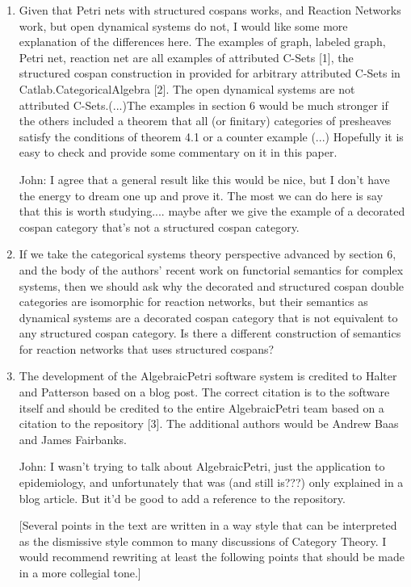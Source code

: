 \documentclass[reqno]{amsart}
\def\john{\color{red} John: }
\begin{document}
\begin{enumerate}
\item Given that Petri nets with structured cospans works, and Reaction Networks work, but open dynamical systems do not, I would like some more 
explanation of the differences here. The examples of graph, labeled 
graph, Petri net, reaction net are all examples of attributed C-Sets [1], the structured cospan construction in provided for arbitrary attributed 
C-Sets in Catlab.CategoricalAlgebra [2]. The open dynamical systems are not attributed C-Sets.(...)The examples in section 6 would be much stronger 
if the others included a theorem that all (or finitary) categories of presheaves satisfy the 
conditions of theorem 4.1 or a counter example (...) Hopefully it is easy to check and provide some 
commentary 
on it in this paper.

{\john I agree that a general result like this would be nice, but I don't have the energy to dream one up and prove it. The most we can do here is say 
that this is worth studying.... maybe after we give the example of a decorated cospan category that's not a structured cospan category.}

\item If we take the categorical systems theory perspective advanced by section 6, and the body of the authors’ recent work on functorial semantics 
for complex 
systems, then we should ask why the decorated and structured cospan double categories are isomorphic for reaction networks, but their semantics as 
dynamical systems are a decorated cospan category that is not equivalent to any structured cospan category. Is there a different construction of 
semantics for reaction networks that uses structured cospans?

\item The development of the AlgebraicPetri software system is credited to Halter and Patterson based on a blog post. The correct citation is to the 
software itself and should be credited to the entire AlgebraicPetri team based on a citation to the repository [3]. The additional authors would be 
Andrew Baas and James Fairbanks.

{\john I wasn't trying to talk about AlgebraicPetri, just the application to epidemiology, and unfortunately that was (and still is???) only explained 
in a blog article. But it'd be good to add a reference to the repository.}

[Several points in the text are written in a way style that can be interpreted as the dismissive style common to many discussions of Category 
Theory. I 
would recommend rewriting at least the following points that should be made in a more collegial tone.]


\end{enumerate}
\end{document}
